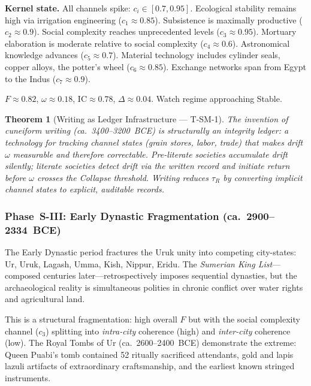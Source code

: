 \documentclass[
  aps,
  prd,
  twocolumn,
  superscriptaddress,
  nofootinbib,
  floatfix
]{revtex4-2}
\newtheorem{theorem}{Theorem}
\newcommand{\tR}{\tau_{\!R}}
\newcommand{\IC}{\mathrm{IC}}
\begin{document}
\textbf{Kernel state.}  All channels spike:
$c_i \in [0.7, 0.95]$.  Ecological stability remains
high via irrigation engineering ($c_1 \approx 0.85$).
Subsistence is maximally productive ($c_2 \approx
0.9$).  Social complexity reaches unprecedented levels
($c_3 \approx 0.95$).  Mortuary elaboration is
moderate relative to social complexity ($c_4 \approx
0.6$).  Astronomical knowledge advances ($c_5 \approx
0.7$).  Material technology includes cylinder seals,
copper alloys, the potter's wheel ($c_6 \approx
0.85$).  Exchange networks span from Egypt to the
Indus ($c_7 \approx 0.9$).

$F \approx 0.82$, $\omega \approx 0.18$,
$\IC \approx 0.78$, $\Delta \approx 0.04$.
Watch regime approaching Stable.

\begin{theorem}[Writing as Ledger Infrastructure ---
T-SM-1]\label{thm:writing}
The invention of cuneiform writing (ca.\ 3400--3200~BCE)
is structurally an integrity ledger: a technology for
tracking channel states (grain stores, labor, trade)
that makes drift $\omega$ \emph{measurable} and
therefore correctable.  Pre-literate societies
accumulate drift silently; literate societies detect
drift via the written record and initiate return before
$\omega$ crosses the Collapse threshold.  Writing
reduces $\tR$ by converting implicit channel states to
explicit, auditable records.
\end{theorem}


\subsubsection{Phase~S-III: Early Dynastic Fragmentation
(ca.\ 2900--2334~BCE)}\label{sec:earlydynastic}

The Early Dynastic period fractures the Uruk unity into
competing city-states: Ur, Uruk, Lagash, Umma, Kish,
Nippur, Eridu.  The \emph{Sumerian King List}---composed
centuries later---retrospectively imposes sequential
dynasties, but the archaeological reality is
simultaneous polities in chronic conflict over water
rights and agricultural land.

This is a structural fragmentation: high overall $F$
but with the social complexity channel ($c_3$)
splitting into \emph{intra-city} coherence (high) and
\emph{inter-city} coherence (low).  The Royal Tombs of
Ur (ca.\ 2600--2400~BCE) demonstrate the extreme:
Queen Puabi's tomb contained 52 ritually sacrificed
attendants, gold and lapis lazuli artifacts of
extraordinary craftsmanship, and the earliest known
stringed instruments.
\end{document}
